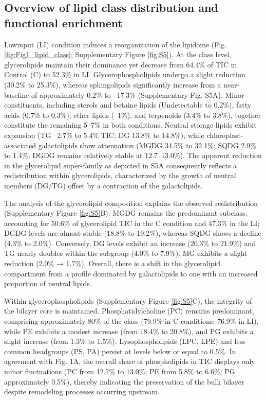 \documentclass[10pt,letterpaper]{article}
\begin{document}
\subsection*{Overview of lipid class distribution and functional enrichment}
Lowinput (LI) condition induces a reorganization of the lipidome (Fig.\ref{fig:Fig1_lipid_class}; Supplementary Figure \ref{fig:S5}). At the class level, glycerolipids maintain their dominance yet decrease from 64.4\% of TIC in Control (C) to 52.3\% in LI. Glycerophospholipids undergo a slight reduction (30.2\% to 25.3\%), whereas sphingolipids significantly increase from a near-baseline of approximately 0.2\% to ~17.3\% (Supplementary Fig. S5A). Minor constituents, including sterols and betaine lipids (Undetectable to 0.2\%), fatty acids (0.7\% to 0.3\%), ether lipids (~1\%), and terpenoids (3.4\% to 3.8\%), together constitute the remaining 5–7\% in both conditions. Neutral storage lipids exhibit expansion (TG ~2.7\% to 5.4\% TIC; DG 13.8\% to 14.8\%), while chloroplast-associated galactolipids show attenuation (MGDG 34.5\% to 32.1\%; SQDG 2.9\% to 1.4\%; DGDG remains relatively stable at 12.7–13.0\%). The apparent reduction in the glycerolipid super-family as depicted in S5A consequently reflects a redistribution within glycerolipids, characterized by the growth of neutral members (DG/TG) offset by a contraction of the galactolipids.

The analysis of the glycerolipid composition explains the observed redistribution (Supplementary Figure \ref{fig:S5}B). MGDG remains the predominant subclass, accounting for 50.6\% of glycerolipid TIC in the C condition and 47.3\% in the LI; DGDG levels are almost stable (18.8\% to 19.2\%), whereas SQDG shows a decline (4.3\% to 2.0\%). Conversely, DG levels exhibit an increase (20.3\% to 21.9\%) and TG nearly doubles within the subgroup (4.0\% to 7.9\%). MG exhibits a slight reduction (2.0\% → 1.7\%). Overall, there is a shift in the glycerolipid compartment from a profile dominated by galactolipids to one with an increased proportion of neutral lipids.

Within glycerophospholipids (Supplementary Figure \ref{fig:S5}C), the integrity of the bilayer core is maintained. Phosphatidylcholine (PC) remains predominant, comprising approximately 80\% of the class (79.9\% in C conditions; 76.9\% in LI), while PE exhibits a modest increase (from 18.4\% to 20.8\%), and PG exhibits a slight increase (from 1.3\% to 1.5\%). Lysophospholipids (LPC, LPE) and less common headgroups (PS, PA) persist at levels below or equal to 0.5\%. In agreement with Fig. 1A, the overall share of phospholipids in TIC displays only minor fluctuations (PC from 12.7\% to 13.0\%; PE from 5.8\% to 6.6\%; PG approximately 0.5\%), thereby indicating the preservation of the bulk bilayer despite remodeling processes occurring upstream.
\end{document}
